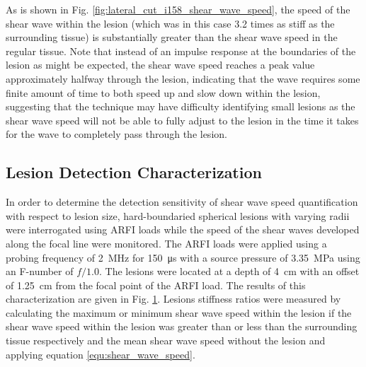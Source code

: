 			As is shown in Fig. \ref{fig:lateral_cut_i158_shear_wave_speed}, the speed of the shear wave within the lesion (which was in this case 3.2 times as stiff as the surrounding tissue) is substantially greater than the shear wave speed in the regular tissue. Note that instead of an impulse response at the boundaries of the lesion as might be expected, the shear wave speed reaches a peak value approximately halfway through the lesion, indicating that the wave requires some finite amount of time to both speed up and slow down within the lesion, suggesting that the technique may have difficulty identifying small lesions as the shear wave speed will not be able to fully adjust to the lesion in the time it takes for the wave to completely pass through the lesion.

		\FloatBarrier
		\subsection{Lesion Detection Characterization}
			In order to determine the detection sensitivity of shear wave speed quantification with respect to lesion size, hard-boundaried spherical lesions with varying radii were interrogated using ARFI loads while the speed of the shear waves developed along the focal line were monitored. The ARFI loads were applied using a probing frequency of \SI{2}{\MHz} for \SI{150}{\us} with a source pressure of \SI{3.35}{\MPa} using an F-number of $f/1.0$. The lesions were located at a depth of \SI{4}{\cm} with an offset of \SI{1.25}{\cm} from the focal point of the ARFI load. The results of this characterization are given in Fig. \ref{fig:erel_radius}. Lesions stiffness ratios were measured by calculating the maximum or minimum shear wave speed within the lesion if the shear wave speed within the lesion was greater than or less than the surrounding tissue respectively and the mean shear wave speed without the lesion and applying equation \ref{equ:shear_wave_speed}.

			\begin{figure}[!htb]
				\centering
				\caption[Numerical characterization of shear wave speed measured stiffness ratio with changing lesion radii]{}
				\label{fig:erel_radius}
			\end{figure}

